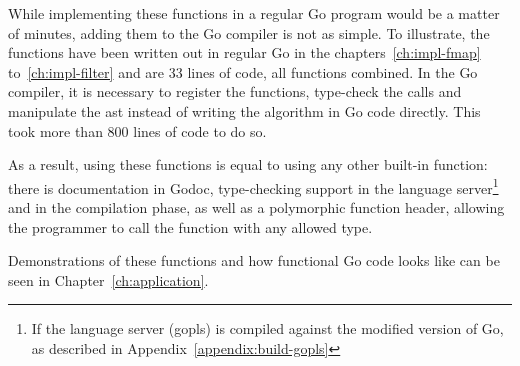 While implementing these functions in a regular Go program would be a matter of minutes,
adding them to the Go compiler is not as simple. To illustrate, the functions
have been written out in regular Go in the chapters~\ref{ch:impl-fmap} to~\ref{ch:impl-filter}
and are 33 lines of code, all functions combined. In the Go compiler, it is necessary to
register the functions, type-check the calls and manipulate the \gls{ast} instead of writing
the algorithm in Go code directly. This took more than 800 lines of code to do so.

As a result, using these functions is equal to using any other built-in function: there
is documentation in Godoc, type-checking support in the language server\footnote{If the
language server (gopls) is compiled against the modified version of Go, as
described in Appendix~\ref{appendix:build-gopls}}
and in the compilation phase, as well as a polymorphic function header, allowing the
programmer to call the function with any allowed type.

Demonstrations of these functions and how functional Go code looks like can be seen in
Chapter~\ref{ch:application}.









